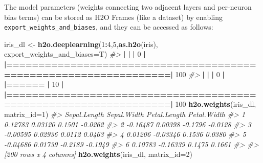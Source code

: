 \documentclass[]{book}
\newenvironment{Shaded}{\begin{snugshade}}{\end{snugshade}}
\newcommand{\CommentTok}[1]{\textcolor[rgb]{0.56,0.35,0.01}{\textit{#1}}}
\newcommand{\DataTypeTok}[1]{\textcolor[rgb]{0.13,0.29,0.53}{#1}}
\newcommand{\DecValTok}[1]{\textcolor[rgb]{0.00,0.00,0.81}{#1}}
\newcommand{\ErrorTok}[1]{\textcolor[rgb]{0.64,0.00,0.00}{\textbf{#1}}}
\newcommand{\KeywordTok}[1]{\textcolor[rgb]{0.13,0.29,0.53}{\textbf{#1}}}
\newcommand{\NormalTok}[1]{#1}
\newcommand{\OperatorTok}[1]{\textcolor[rgb]{0.81,0.36,0.00}{\textbf{#1}}}
\newcommand{\StringTok}[1]{\textcolor[rgb]{0.31,0.60,0.02}{#1}}
\begin{document}
The model parameters (weights connecting two adjacent layers and per-neuron bias terms) can be stored as H2O Frames (like a dataset) by enabling \texttt{export\_weights\_and\_biases}, and they can be accessed as follows:

\begin{Shaded}
\begin{Highlighting}[]
\NormalTok{iris_dl <-}\StringTok{ }\KeywordTok{h2o.deeplearning}\NormalTok{(}\DecValTok{1}\OperatorTok{:}\DecValTok{4}\NormalTok{,}\DecValTok{5}\NormalTok{,}\KeywordTok{as.h2o}\NormalTok{(iris),}
             \DataTypeTok{export_weights_and_biases=}\NormalTok{T)}
\CommentTok{#> }
  \OperatorTok{|}\StringTok{                                                                       }
\StringTok{  }\ErrorTok{|}\StringTok{                                                                 }\ErrorTok{|}\StringTok{   }\DecValTok{0}\NormalTok{%}
  \OperatorTok{|}\StringTok{                                                                       }
\StringTok{  }\ErrorTok{|=================================================================|}\StringTok{ }\DecValTok{100}\NormalTok{%}
\CommentTok{#> }
  \OperatorTok{|}\StringTok{                                                                       }
\StringTok{  }\ErrorTok{|}\StringTok{                                                                 }\ErrorTok{|}\StringTok{   }\DecValTok{0}\NormalTok{%}
  \OperatorTok{|}\StringTok{                                                                       }
\StringTok{  }\ErrorTok{|======}\StringTok{                                                           }\ErrorTok{|}\StringTok{  }\DecValTok{10}\NormalTok{%}
  \OperatorTok{|}\StringTok{                                                                       }
\StringTok{  }\ErrorTok{|=================================================================|}\StringTok{ }\DecValTok{100}\NormalTok{%}
\KeywordTok{h2o.weights}\NormalTok{(iris_dl, }\DataTypeTok{matrix_id=}\DecValTok{1}\NormalTok{)}
\CommentTok{#>   Sepal.Length Sepal.Width Petal.Length Petal.Width}
\CommentTok{#> 1      0.12783     0.03120       0.1501     -0.0262}
\CommentTok{#> 2     -0.16487     0.00398      -0.1796     -0.0128}
\CommentTok{#> 3     -0.00595     0.02936       0.0112      0.0463}
\CommentTok{#> 4      0.01206    -0.03346       0.1536      0.0380}
\CommentTok{#> 5     -0.04686     0.01739      -0.2189     -0.1949}
\CommentTok{#> 6      0.10783    -0.16339       0.1475      0.1661}
\CommentTok{#> }
\CommentTok{#> [200 rows x 4 columns]}
\KeywordTok{h2o.weights}\NormalTok{(iris_dl, }\DataTypeTok{matrix_id=}\DecValTok{2}\NormalTok{)}
}}}}}
\end{Highlighting}
\end{Shaded}
\end{document}

